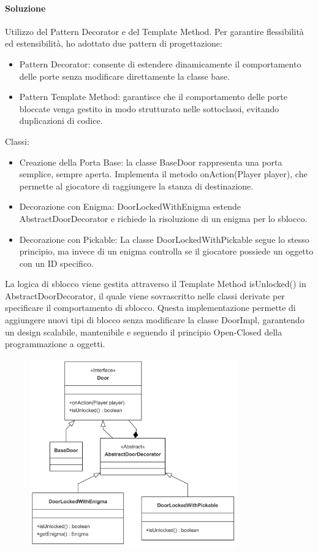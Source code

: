\documentclass[a4paper,12pt]{report}
\begin{document}
\paragraph{Soluzione} %
Utilizzo del Pattern Decorator e del Template Method.
Per garantire flessibilità ed estensibilità, ho adottato due pattern di progettazione:
\begin{itemize}
	\item Pattern Decorator: consente di estendere dinamicamente il comportamento delle porte senza modificare direttamente la classe base.
	\item Pattern Template Method: garantisce che il comportamento delle porte bloccate venga gestito in modo strutturato nelle sottoclassi, evitando duplicazioni di codice.
\end{itemize}
Classi:
\begin{itemize}
	\item Creazione della Porta Base: la classe BaseDoor rappresenta una porta semplice, sempre aperta. Implementa il metodo onAction(Player player), che permette al giocatore di raggiungere la stanza di destinazione.
	\item Decorazione con Enigma: DoorLockedWithEnigma estende AbstractDoorDecorator e richiede la risoluzione di un enigma per lo sblocco.
	\item Decorazione con Pickable: La classe DoorLockedWithPickable segue lo stesso principio, ma invece di un enigma controlla se il giocatore possiede un oggetto con un ID specifico.
\end{itemize}
La logica di sblocco viene gestita attraverso il Template Method isUnlocked() in AbstractDoorDecorator, il quale viene sovrascritto nelle classi derivate per specificare il comportamento di sblocco. 
Questa implementazione permette di aggiungere nuovi tipi di blocco senza modificare la classe DoorImpl, garantendo un design scalabile, mantenibile e seguendo il principio Open-Closed della programmazione a oggetti.
\begin{figure}[h]
    \centering
    \includegraphics[width=0.8\textwidth]{img/doors.png}
    \label{img:doors}
\end{figure}
\end{document}
